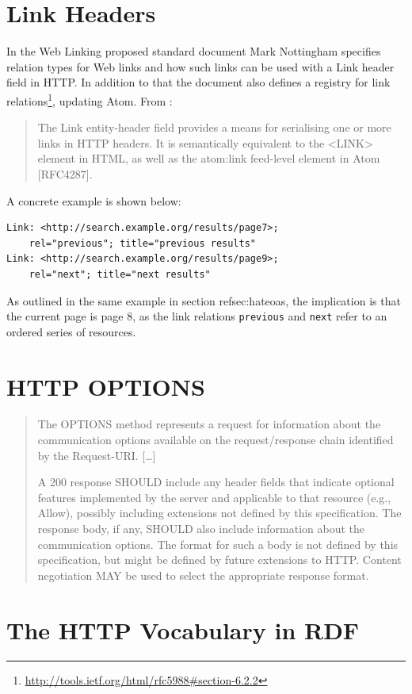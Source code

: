 \documentclass{acm_proc_article-sp}
\begin{document}
\section{Link Headers}\label{sec:linkheaders}
In the Web Linking\cite{Link:Headers} proposed standard document Mark Nottingham specifies relation types for Web links and how such links can be used with a Link header field in HTTP. In addition to that the document also defines a registry for link relations\footnote{\url{http://tools.ietf.org/html/rfc5988\#section-6.2.2}}, updating Atom\cite{Atom:Synd}. From \cite{Link:Headers}:
\begin{quotation}
The Link entity-header field provides a means for serialising one or more links in HTTP headers.  It is semantically equivalent to the <LINK> element in HTML, as well as the atom:link feed-level element in Atom [RFC4287].
\end{quotation}
A concrete example is shown below:
\begin{verbatim}
Link: <http://search.example.org/results/page7>;
    rel="previous"; title="previous results"
Link: <http://search.example.org/results/page9>;
    rel="next"; title="next results"
\end{verbatim}
As outlined in the same example in section ref{sec:hateoas}, the implication is that the current page is page 8, as the link relations \texttt{previous} and \texttt{next} refer to an ordered series of resources.

\section{HTTP OPTIONS}\label{sec:httpoptions}
\begin{quotation}
The OPTIONS method represents a request for information about the communication options available on the request/response chain identified by the Request-URI. [\ldots]

A 200 response SHOULD include any header fields that indicate optional features implemented by the server and applicable to that resource (e.g., Allow), possibly including extensions not defined by this specification. The response body, if any, SHOULD also include information about the communication options. The format for such a body is not defined by this specification, but might be defined by future extensions to HTTP. Content negotiation MAY be used to select the appropriate response format.
\end{quotation} \cite{HTTP:Spec}

\section{The HTTP Vocabulary in RDF}\label{sec:httpvocab}
\cite{HTTP:RDF}
\end{document}
